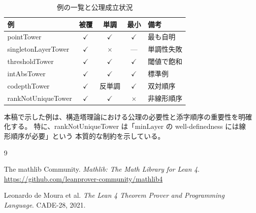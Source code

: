 \documentclass[a4paper,11pt]{ltjsarticle}
\theoremstyle{definition}
\theoremstyle{plain}
\theoremstyle{remark}
\newcommand{\minLayer}{\mathrm{minLayer}}
\begin{document}
\begin{table}[htbp]
\centering
\caption{例の一覧と公理成立状況}
\label{tab:summary}
\small
\begin{tabular}{|l|c|c|c|l|}
\hline
\textbf{例} & \textbf{被覆} & \textbf{単調} & \textbf{最小} & \textbf{備考} \\
\hline
pointTower & $\checkmark$ & $\checkmark$ & $\checkmark$ & 最も自明 \\
singletonLayerTower & $\checkmark$ & $\times$ & — & 単調性失敗 \\
thresholdTower & $\checkmark$ & $\checkmark$ & $\checkmark$ & 閾値で飽和 \\
intAbsTower & $\checkmark$ & $\checkmark$ & $\checkmark$ & 標準例 \\
codepthTower & $\checkmark$ & 反単調 & $\checkmark$ & 双対順序 \\
rankNotUniqueTower & $\checkmark$ & $\checkmark$ & $\times$ & 非線形順序 \\
\hline
\end{tabular}
\end{table}

本稿で示した例は、構造塔理論における公理の必要性と添字順序の重要性を明確化する。
特に、rankNotUniqueTower は「$\minLayer$ の well-definedness には線形順序が必要」という
本質的な制約を示している。


\begin{thebibliography}{9}

The mathlib Community.
\textit{Mathlib: The Math Library for Lean 4}.
\url{https://github.com/leanprover-community/mathlib4}

Leonardo de Moura et al.
\textit{The Lean 4 Theorem Prover and Programming Language}.
CADE-28, 2021.

\end{thebibliography}
\end{document}
